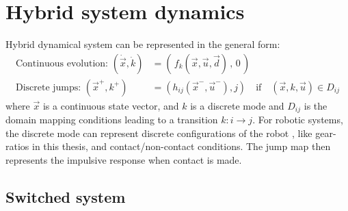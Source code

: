 

\section{Hybrid system dynamics}

Hybrid dynamical system can be represented in the general form:
%
\begin{align}
\text{Continuous evolution: } \left(  \dot{\vec{x}} , \dot{k} \right) &=  \left( \, f_k( \vec{x} , \vec{u} , \vec{d} ) \, , \, 0 \, \right) \\
\text{Discrete jumps: } \left(  \vec{x}^+ , k^+ \right) &=  \left( h_{ij}( \vec{x}^- , \vec{u}^- ) , j \right) \quad\text{if}\quad \left(  \vec{x} , k , \vec{u} \right) \in D_{ij}  
\end{align}
%
where $\vec{x}$ is a continuous state vector, and $k$ is a discrete mode and $D_{ij}$ is the domain mapping conditions leading to a transition $k:i \rightarrow j$. For robotic systems, the discrete mode can represent discrete configurations of the robot , like gear-ratios in this thesis, and contact/non-contact conditions. The jump map then represents the impulsive response when contact is made. 

\subsection{Switched system}


